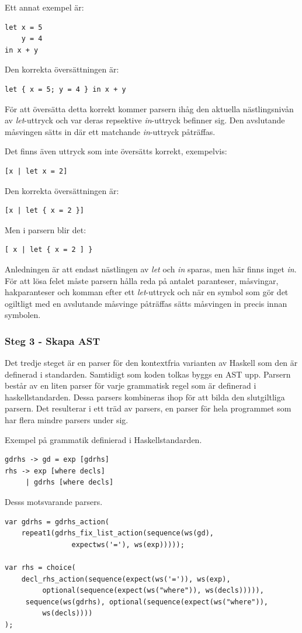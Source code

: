 Ett annat exempel är:
\begin{lstlisting}
let x = 5
    y = 4
in x + y
\end{lstlisting}
Den korrekta översättningen är:
\begin{lstlisting}
let { x = 5; y = 4 } in x + y
\end{lstlisting}
För att översätta detta korrekt kommer parsern ihåg den aktuella nästlingsnivån av \emph{let}-uttryck och var deras repsektive \emph{in}-uttryck befinner sig. 
Den avslutande måsvingen sätts in där ett matchande \emph{in}-uttryck påträffas.

Det finns även uttryck som inte översätts korrekt, exempelvis:
\begin{lstlisting}
[x | let x = 2]
\end{lstlisting}
Den korrekta översättningen är:
\begin{lstlisting}
[x | let { x = 2 }]
\end{lstlisting}
Men i parsern blir det:
\begin{lstlisting}
[ x | let { x = 2 ] }
\end{lstlisting}
Anledningen är att endast nästlingen av \emph{let} och \emph{in} sparas, men här finns inget \emph{in}.
För att lösa felet måste parsern hålla reda på antalet paranteser, måsvingar, hakparanteser och komman efter ett \emph{let}-uttryck och när en symbol som gör det ogiltligt 
med en avslutande måsvinge påträffas sätts måsvingen in precis innan symbolen.

\subsubsection{Steg 3 - Skapa AST}
Det tredje steget är en parser för den kontextfria varianten av Haskell som den är definerad i standarden. 
Samtidigt som koden tolkas byggs en AST upp. Parsern består av en liten parser för varje grammatisk regel som är definerad i haskellstandarden. 
Dessa parsers kombineras ihop för att bilda den slutgiltliga parsern. Det resulterar i ett träd av parsers, en parser för hela programmet som har flera mindre parsers under sig.

Exempel på grammatik definierad i Haskellstandarden.
\begin{lstlisting}
gdrhs -> gd = exp [gdrhs]
rhs -> exp [where decls]
     | gdrhs [where decls]
\end{lstlisting}
Desss motsvarande parsers.
\begin{lstlisting}
var gdrhs = gdrhs_action(
    repeat1(gdrhs_fix_list_action(sequence(ws(gd), 
                expectws('='), ws(exp)))));

var rhs = choice(
    decl_rhs_action(sequence(expect(ws('=')), ws(exp), 
         optional(sequence(expect(ws("where")), ws(decls))))),
     sequence(ws(gdrhs), optional(sequence(expect(ws("where")), 
         ws(decls))))
);
\end{lstlisting}

